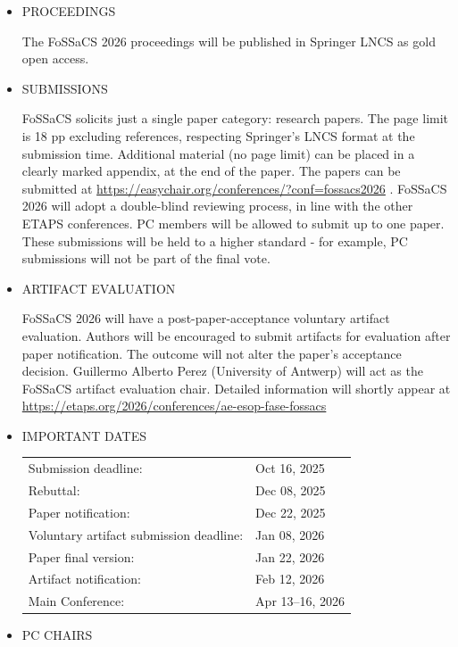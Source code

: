 \documentclass[prodmode,acmtecs]{acmsmall} %
\begin{document}
{\begin{itemize}
\item  PROCEEDINGS 
 
  The FoSSaCS 2026 proceedings will be published in Springer LNCS as gold open access. 
 
\item  SUBMISSIONS 
 
  FoSSaCS solicits just a single paper category: research papers. The page limit is 18 pp excluding references, respecting Springer’s LNCS format at the submission time. Additional material (no page limit) can be placed in a clearly marked appendix, at the end of the paper.  The papers can be submitted at \href{https://easychair.org/conferences/?conf=fossacs2026}{https://easychair.org/conferences/?conf=fossacs2026} . FoSSaCS 2026 will adopt a double-blind reviewing process, in line with the other ETAPS conferences. PC members will be allowed to submit up to one paper. These submissions will be held to a higher standard - for example, PC submissions will not be part of the final vote. 
 
\item  ARTIFACT EVALUATION 
 
  FoSSaCS 2026 will have a post-paper-acceptance voluntary artifact evaluation. Authors will be encouraged to submit artifacts for evaluation after paper notification. The outcome will not alter the paper’s acceptance decision. Guillermo Alberto Perez (University of Antwerp) will act as the FoSSaCS artifact  evaluation chair. Detailed information will shortly appear at \href{https://etaps.org/2026/conferences/ae-esop-fase-fossacs}{https://etaps.org/2026/conferences/ae-esop-fase-fossacs} 
 
\item  IMPORTANT DATES 
 
\begin{tabulary}{\linewidth}{LL}Submission deadline:  & Oct 16, 2025 \\
Rebuttal:  & Dec 08, 2025 \\
Paper notification:  & Dec 22, 2025 \\
Voluntary artifact submission deadline:  & Jan 08, 2026 \\
Paper final version:  & Jan 22, 2026 \\
Artifact notification:  & Feb 12, 2026 \\
Main Conference:  & Apr 13–16, 2026 \\
\end{tabulary}
 
\item  PC CHAIRS 
 

\end{itemize}}
\end{document}
